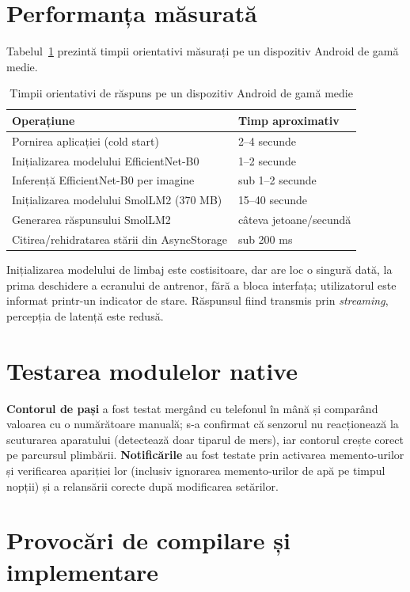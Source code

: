 \documentclass[12pt, a4paper, twoside]{report}
\numberwithin{equation}{section}
\begin{document}
\section{Performanța măsurată}

Tabelul~\ref{tab:performanta} prezintă timpii orientativi măsurați pe un dispozitiv Android
de gamă medie.

\begin{table}[H]
\centering
\caption{Timpii orientativi de răspuns pe un dispozitiv Android de gamă medie}
\label{tab:performanta}
\begin{tabularx}{\textwidth}{lX}
\toprule
\textbf{Operațiune} & \textbf{Timp aproximativ} \\
\midrule
Pornirea aplicației (cold start) & 2--4 secunde \\
Inițializarea modelului EfficientNet-B0 & 1--2 secunde \\
Inferență EfficientNet-B0 per imagine & sub 1--2 secunde \\
Inițializarea modelului SmolLM2 (370 MB) & 15--40 secunde \\
Generarea răspunsului SmolLM2 & câteva jetoane/secundă \\
Citirea/rehidratarea stării din AsyncStorage & sub 200 ms \\
\bottomrule
\end{tabularx}
\end{table}

Inițializarea modelului de limbaj este costisitoare, dar are loc o singură dată, la prima
deschidere a ecranului de antrenor, fără a bloca interfața; utilizatorul este informat
printr-un indicator de stare. Răspunsul fiind transmis prin \textit{streaming}, percepția de
latență este redusă.

\section{Testarea modulelor native}

\textbf{Contorul de pași} a fost testat mergând cu telefonul în mână și comparând valoarea cu
o numărătoare manuală; s-a confirmat că senzorul nu reacționează la scuturarea aparatului
(detectează doar tiparul de mers), iar contorul crește corect pe parcursul plimbării.
\textbf{Notificările} au fost testate prin activarea memento-urilor și verificarea apariției
lor (inclusiv ignorarea memento-urilor de apă pe timpul nopții) și a relansării corecte după
modificarea setărilor.

\section{Provocări de compilare și implementare}
\end{document}
